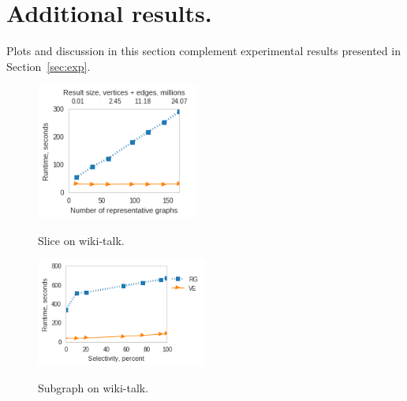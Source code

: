 \section{Additional results.}
\label{sec:app2}

Plots and discussion in this section complement experimental results
presented in Section~\ref{sec:exp}.

\begin{figure}[th]
\centering
\begin{minipage}{2.1in}
\centering
\includegraphics[width=2.1in]{figs/slice_wikitalk_build13.png}
\vspace{-0.2in}
\caption{Slice on wiki-talk.}
\label{fig:slicewiki}
\vspace{-0.1in}
\end{minipage}
\begin{minipage}{2.2in}
\centering
\includegraphics[width=2.2in]{figs/subgraph_wikitalk_build13.png}
\caption{Subgraph on wiki-talk.}
\vspace{-0.1in}
\label{fig:subgraphwiki}
\vspace{-0.1in}
\end{minipage}
\end{figure}

